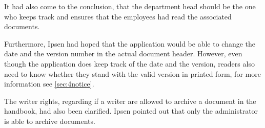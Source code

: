 \documentclass[../../master.tex]{subfiles}
\begin{document}
It had also come to the conclusion, that the department head should be the one who keeps track and ensures that the employees had read the associated documents.

Furthermore, Ipsen had hoped that the application would be able to change the date and the version number in the actual document header.
However, even though the application does keep track of the date and the version, readers also need to know whether they stand with the valid version in printed form, for more information see \cref{sec:4notice}.

The writer rights, regarding if a writer are allowed to archive a document in the handbook, had also been clarified.
Ipsen pointed out that only the administrator is able to archive documents.
\end{document}

